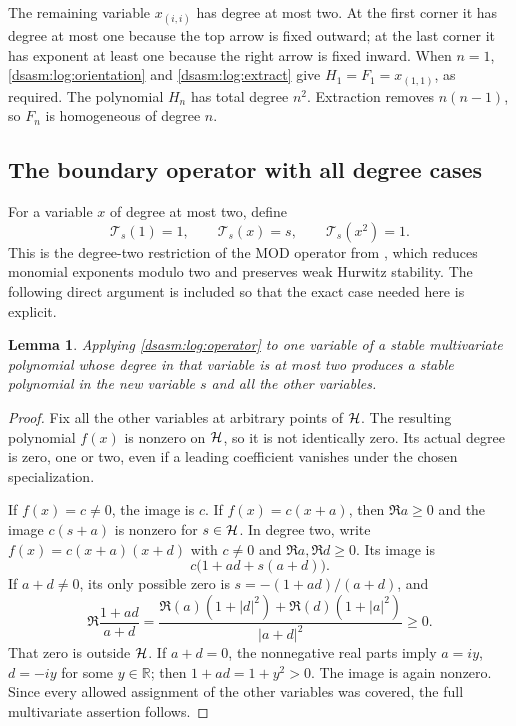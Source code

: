 \documentclass[11pt,letterpaper]{article}
\newtheorem{lemma}[theorem]{Lemma}
\theoremstyle{remark}\newtheorem{remark}[theorem]{Remark}
\newcommand{\R}{\mathbb R}\newcommand{\C}{\mathbb C}\newcommand{\N}{\mathbb N}
\begin{document}
The remaining variable $x_{(i,i)}$ has degree at most two. At the first
corner it has degree at most one because the top arrow is fixed
outward; at the last corner it has exponent at least one because the
right arrow is fixed inward. When $n=1$, \eqref{dsasm:log:orientation} and
\eqref{dsasm:log:extract} give $H_1=F_1=x_{(1,1)}$, as required.
The polynomial $H_n$ has total degree $n^2$. Extraction removes
$n(n-1)$, so $F_n$ is homogeneous of degree $n$.

\subsection{The boundary operator with all degree cases}
For a variable $x$ of degree at most two, define
\begin{equation}\label{dsasm:log:operator}
 \mathcal T_s(1)=1,\qquad \mathcal T_s(x)=s,\qquad
 \mathcal T_s(x^2)=1.
\end{equation}
This is the degree-two restriction of the MOD operator from
\cite[Section 8.4]{bb2}, which reduces monomial exponents modulo two
and preserves weak Hurwitz stability. The following direct argument
is included so that the exact case needed here is explicit.

\begin{lemma}\label{dsasm:log:boundarylemma}
Applying \eqref{dsasm:log:operator} to one variable of a stable multivariate
polynomial whose degree in that variable is at most two produces a
stable polynomial in the new variable $s$ and all the other variables.
\end{lemma}
\begin{proof}
Fix all the other variables at arbitrary points of $\mathcal H$. The resulting
polynomial $f(x)$ is nonzero on $\mathcal H$, so it is not identically zero.
Its actual degree is zero, one or two, even if a leading coefficient
vanishes under the chosen specialization.

If $f(x)=c\ne0$, the image is $c$. If $f(x)=c(x+a)$, then
$\Re a\ge0$ and the image $c(s+a)$ is nonzero for $s\in\mathcal H$.
In degree two, write $f(x)=c(x+a)(x+d)$ with
$c\ne0$ and $\Re a,\Re d\ge0$. Its image is
\[
 c\bigl(1+ad+s(a+d)\bigr).
\]
If $a+d\ne0$, its only possible zero is
$s=-(1+ad)/(a+d)$, and
\begin{equation}\label{dsasm:log:boundaryidentity}
 \Re\frac{1+ad}{a+d}
 =\frac{\Re(a)(1+|d|^2)+\Re(d)(1+|a|^2)}{|a+d|^2}\ge0.
\end{equation}
That zero is outside $\mathcal H$. If $a+d=0$, the nonnegative real parts
imply $a=iy$, $d=-iy$ for some $y\in\R$; then $1+ad=1+y^2>0$.
The image is again nonzero. Since every allowed assignment of the
other variables was covered, the full multivariate assertion follows.
\end{proof}
\end{document}
